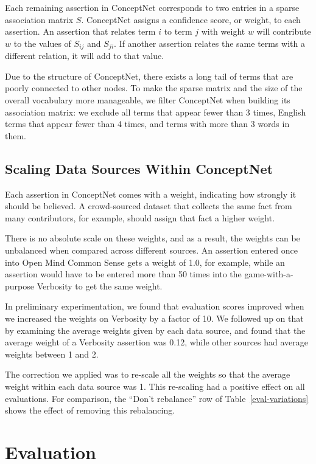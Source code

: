 \documentclass[11pt]{article}
\begin{document}
Each remaining assertion in ConceptNet corresponds to two entries in a sparse
association matrix $S$. ConceptNet assigns a confidence score, or weight, to
each assertion. An assertion that relates term $i$ to term $j$ with weight $w$
will contribute $w$ to the values of $S_{ij}$ and $S_{ji}$. If another
assertion relates the same terms with a different relation, it will add to that
value.

Due to the structure of ConceptNet, there exists a long tail of terms that are
poorly connected to other nodes. To make the sparse matrix and the size of the
overall vocabulary more manageable, we filter ConceptNet when building its
association matrix: we exclude all terms that appear fewer than 3 times, English
terms that appear fewer than 4 times, and terms with more than 3 words in them.

\subsection{Scaling Data Sources Within ConceptNet}

Each assertion in ConceptNet comes with a weight, indicating how strongly it
should be believed. A crowd-sourced dataset that collects the same fact from
many contributors, for example, should assign that fact a higher weight.

There is no absolute scale on these weights, and as a result, the weights can
be unbalanced when compared across different sources. An assertion entered once
into Open Mind Common Sense gets a weight of 1.0, for example, while an
assertion would have to be entered more than 50 times into the
game-with-a-purpose Verbosity to get the same weight.

In preliminary experimentation, we found that evaluation scores improved when
we increased the weights on Verbosity by a factor of 10. We followed up on that
by examining the average weights given by each data source, and found that the
average weight of a Verbosity assertion was 0.12, while other sources had
average weights between 1 and 2.

The correction we applied was to re-scale all the weights so that the average
weight within each data source was 1. This re-scaling had a positive effect
on all evaluations. For comparison, the ``Don't rebalance'' row of
Table~\ref{eval-variations} shows the effect of removing this rebalancing.

\section{Evaluation}
\end{document}
